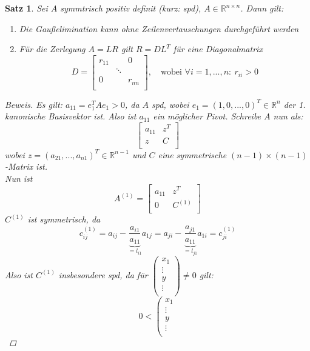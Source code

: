 \documentclass[12pt]{article}
\theoremstyle{break}
\newtheorem{theorem}{Satz}[subsection]
\begin{document}
\begin{theorem}
Sei $A$ symmtrisch positiv definit (kurz: spd), $A \in \mathbb{R}^{n\times n}$. Dann gilt:
\begin{enumerate}
  \item[i)] Die Gaußelimination kann ohne Zeilenvertauschungen durchgeführt werden
  \item[ii)] Für die Zerlegung $A=LR$ gilt $R = DL^T$ für eine Diagonalmatrix 
  $$D =
  \begin{bmatrix}
  r_{11} && 0 \\
  & \ddots \\
  0 && r_{nn} \\
  \end{bmatrix}, \quad \text{wobei }\forall i = 1,...,n: \medspace r_{ii} > 0$$ 
\end{enumerate}
\begin{proof}[Beweis]
Es gilt: $a_{11} = e_{1}^T A e_1 > 0$, da $A$ spd, wobei $e_1 = (1,0,...,0)^T \in \mathbb{R}^n$ der 1. kanonische Basisvektor ist. Also ist $a_{11}$ ein möglicher Pivot. Schreibe $A$ nun als:
$$\left[
\begin{array}{c|c}
a_{11} & z^T \\
\hline
z & C \\
\end{array}
\right]$$
wobei $z = (a_{21}, ..., a_{n1})^T \in \mathbb{R}^{n-1}$ und $C$ eine symmetrische $(n-1)\times(n-1)$-Matrix ist. \\
Nun ist 
$$A^{(1)} = \left[
\begin{array}{c|c}
a_{11} & z^T \\
\hline
0 & C^{(1)} \\
\end{array}
\right]$$
$C^{(1)}$ ist symmetrisch, da 
$$c_{ij}^{(1)} = a_{ij} - \underbrace{\frac{a_{i1}}{a_{11}}}_{= l_{i1}} a_{1j} = a_{ji} - \underbrace{\frac{a_{j1}}{a_{11}}}_{= l_{j1}} a_{1i} = c_{ji}^{(1)}$$
Also ist $C^{(1)}$ insbesondere spd, da für 
$\left(
\begin{array}{c}
x_1 \\
\hline
\vdots \\
y \\
\vdots \\
\end{array}
\right) \neq 0 $ gilt:
$$ 0 < 
\left(
\begin{array}{c}
x_1 \\
\hline
\vdots \\
y \\
\vdots \\

\end{array}$$
\end{proof}
\end{theorem}
\end{document}
